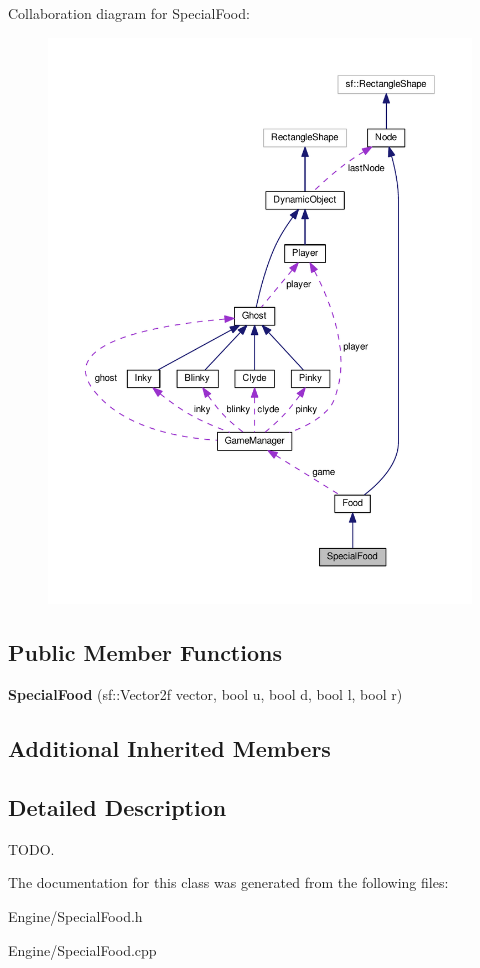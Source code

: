 Collaboration diagram for Special\+Food\+:\nopagebreak
\begin{figure}[H]
\begin{center}
\leavevmode
\includegraphics[width=350pt]{classSpecialFood__coll__graph}
\end{center}
\end{figure}
\subsection*{Public Member Functions}
\begin{DoxyCompactItemize}
\item 
\mbox{\label{classSpecialFood_a1a6213e08538231651bd423f2563eb6f}} 
{\bfseries Special\+Food} (sf\+::\+Vector2f vector, bool u, bool d, bool l, bool r)
\end{DoxyCompactItemize}
\subsection*{Additional Inherited Members}


\subsection{Detailed Description}
T\+O\+DO. 

The documentation for this class was generated from the following files\+:\begin{DoxyCompactItemize}
\item 
Engine/Special\+Food.\+h\item 
Engine/Special\+Food.\+cpp\end{DoxyCompactItemize}
